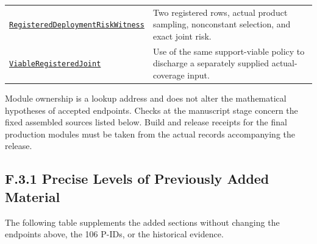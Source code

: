 \documentclass[
  english,
  11pt,
  oneside]{book}
\begin{document}
{\begin{longtable}[]{@{}
  >{\raggedright\arraybackslash}p{}
  >{\raggedright\arraybackslash}p{}@{}}
\href{../formalization/ueot-core/UEOT/V3/Compression/TheoryCompletion/UnifiedClosure/RegisteredDeploymentRiskWitness.lean}{\nolinkurl{RegisteredDeploymentRiskWitness}} & Two registered rows, actual product sampling, nonconstant selection, and exact joint risk. \\
\href{../formalization/ueot-core/UEOT/V3/Compression/TheoryCompletion/UnifiedClosure/ViableRegisteredJoint.lean}{\nolinkurl{ViableRegisteredJoint}} & Use of the same support-viable policy to discharge a separately supplied actual-coverage input. \\
\end{longtable}
}

Module ownership is a lookup address and does not alter the mathematical hypotheses of accepted endpoints. Checks at the manuscript stage concern the fixed assembled sources listed below. Build and release receipts for the final production modules must be taken from the actual records accompanying the release.

\subsection{F.3.1 Precise Levels of Previously Added Material}\label{f.3.1-precise-levels-of-previously-added-material}

The following table supplements the added sections without changing the endpoints above, the 106 P-IDs, or the historical evidence.
\end{document}
